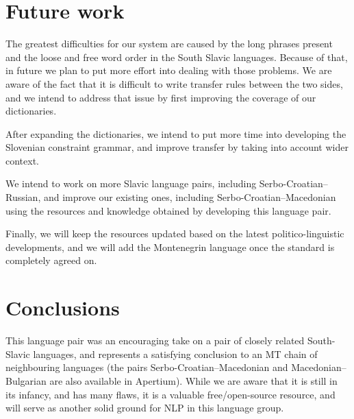 \section{Future work}

The greatest difficulties for our system are caused by the long phrases present 
and the loose and free word order in the South Slavic languages.
Because of that, in future we plan to put more effort into dealing with those problems.
We are aware of the fact that it is difficult to write transfer rules between the two sides,
and we intend to address that issue by first improving the coverage of our dictionaries.

After expanding the dictionaries, we intend to put more time into developing the Slovenian constraint grammar,
and improve transfer by taking into account wider context.

We intend to work on more Slavic language pairs, including Serbo-Croatian--Russian,
and improve our existing ones, including Serbo-Croatian--Macedonian \cite{peradin12} using the 
resources and knowledge obtained by developing this language pair.

Finally, we will keep the resources updated based on the latest politico-linguistic developments,
and we will add the Montenegrin language once the standard is completely agreed on.



\section{Conclusions}

This language pair was an encouraging take on a pair of closely
related South-Slavic languages, and represents a satisfying conclusion
to an MT chain of neighbouring languages (the pairs Serbo-Croatian--Macedonian 
and Macedonian--Bulgarian are also available in Apertium). While we are aware that it
is still in its infancy, and has many flaws, it is a valuable
free/open-source resource, and will serve as another solid ground for NLP
in this language group.

